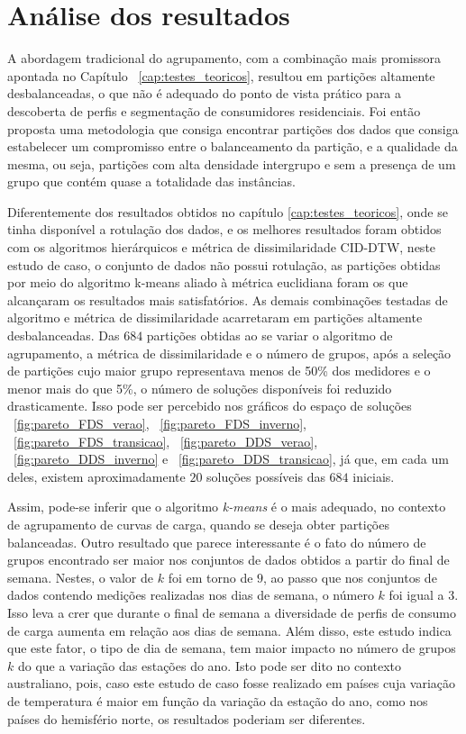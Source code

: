 \section{Análise dos resultados}

A abordagem tradicional do agrupamento, com a combinação mais promissora apontada no Capítulo ~\ref{cap:testes_teoricos}, resultou em partições altamente desbalanceadas, o que não é adequado do ponto de vista prático para a descoberta de perfis e segmentação de consumidores residenciais. Foi então proposta uma metodologia que consiga encontrar partições dos dados que consiga estabelecer um compromisso entre o balanceamento da partição, e a qualidade da mesma, ou seja, partições com alta densidade intergrupo e sem a presença de um grupo que contém quase a totalidade das instâncias.

Diferentemente dos resultados obtidos no capítulo \ref{cap:testes_teoricos}, onde se tinha disponível a rotulação dos dados, e os melhores resultados foram obtidos com os algoritmos hierárquicos e métrica de dissimilaridade CID-DTW, neste estudo de caso, o conjunto de dados não possui rotulação, as partições obtidas por meio do algoritmo k-means aliado à métrica euclidiana foram os que alcançaram os resultados mais satisfatórios. As demais combinações testadas de algoritmo e métrica de dissimilaridade acarretaram em partições altamente desbalanceadas. Das $684$ partições obtidas ao se variar o algoritmo de agrupamento, a métrica de dissimilaridade e o número de grupos, após a seleção de partições cujo maior grupo representava menos de 50\% dos medidores e o menor mais do que 5\%, o número de soluções disponíveis foi reduzido drasticamente. Isso pode ser percebido nos gráficos do espaço de soluções ~\ref{fig:pareto_FDS_verao}, ~\ref{fig:pareto_FDS_inverno}, ~\ref{fig:pareto_FDS_transicao}, ~\ref{fig:pareto_DDS_verao}, ~\ref{fig:pareto_DDS_inverno} e ~\ref{fig:pareto_DDS_transicao},  já que, em cada um deles, existem aproximadamente $20$ soluções possíveis das $684$ iniciais.

Assim, pode-se inferir que o algoritmo \emph{k-means} é o mais adequado, no contexto de agrupamento de curvas de carga, quando se deseja obter partições balanceadas. Outro resultado que parece interessante é o fato do número de grupos encontrado ser maior nos conjuntos de dados obtidos a partir do final de semana. Nestes, o valor de $k$ foi em torno de $9$, ao passo que nos conjuntos de dados contendo medições realizadas nos dias de semana, o número $k$ foi igual a 3. Isso leva a crer que durante o final de semana a diversidade de perfis de consumo de carga aumenta em relação aos dias de semana. Além disso, este estudo indica que este fator, o tipo de dia de semana, tem maior impacto no número de grupos $k$ do que a variação das estações do ano. Isto pode ser dito no contexto australiano, pois, caso este estudo de caso fosse realizado em países cuja variação de temperatura é maior em função da variação da estação do ano, como nos países do hemisfério norte, os resultados poderiam ser diferentes.

